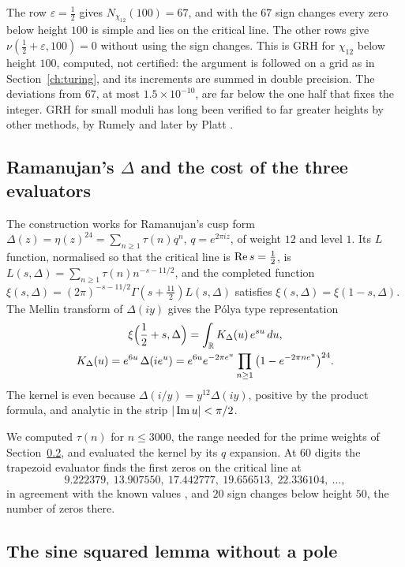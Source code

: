 The row $\varepsilon=\frac12$ gives $N_{\chi_{12}}(100)=67$, and with the $67$ sign changes every zero below height $100$ is simple and lies on the critical line. The other rows give $\nu(\frac12+\varepsilon,100)=0$ without using the sign changes. This is GRH for $\chi_{12}$ below height $100$, computed, not certified: the argument is followed on a grid as in Section~\ref{ch:turing}, and its increments are summed in double precision. The deviations from $67$, at most $1.5\times10^{-10}$, are far below the one half that fixes the integer. GRH for small moduli has long been verified to far greater heights by other methods, by Rumely \cite{Rumely93} and later by Platt \cite{Platt16}.

\subsection{Ramanujan's \texorpdfstring{$\Delta$}{Delta} and the cost of the three evaluators}\label{sec:ch16:delta}

The construction works for Ramanujan's cusp form $\Delta(z)=\eta(z)^{24}=\sum_{n\ge1}\tau(n)q^n$, $q=e^{2\pi iz}$, of weight $12$ and level $1$. Its $L$ function, normalised so that the critical line is $\operatorname{Re} s=\frac12$, is $L(s,\Delta)=\sum_{n\ge1}\tau(n)n^{-s-11/2}$, and the completed function $\xi(s,\Delta)=(2\pi)^{-s-11/2}\Gamma(s+\frac{11}2)L(s,\Delta)$ satisfies $\xi(s,\Delta)=\xi(1-s,\Delta)$. The Mellin transform of $\Delta(iy)$ gives the P\'olya type representation
\begin{gather*}
\xi\Big(\frac12+s,\Delta\Big)=\int_{\mathbb{R}}K_\Delta(u)\,e^{su}\,du,\\
K_\Delta(u)=e^{6u}\,\Delta(ie^u)=e^{6u}e^{-2\pi e^u}\prod_{n\ge1}\big(1-e^{-2\pi ne^u}\big)^{24}.
\end{gather*}
The kernel is even because $\Delta(i/y)=y^{12}\Delta(iy)$, positive by the product formula, and analytic in the strip $|\operatorname{Im} u|<\pi/2$.

We computed $\tau(n)$ for $n\le3000$, the range needed for the prime weights of Section~\ref{sec:ch16:sin2}, and evaluated the kernel by its $q$ expansion. At $60$ digits the trapezoid evaluator finds the first zeros on the critical line at
\[
9.222379,\ 13.907550,\ 17.442777,\ 19.656513,\ 22.336104,\ \dots,
\]
in agreement with the known values \cite[modular form 1.12.a.a]{LMFDB}, and $20$ sign changes below height $50$, the number of zeros there.
\subsection{The sine squared lemma without a pole}\label{sec:ch16:sin2}

